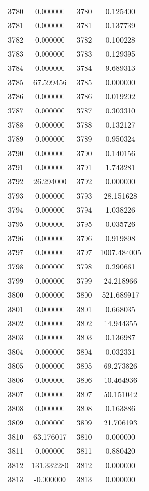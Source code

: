 \documentclass[12pt]{article}
\begin{document}
\begin{longtable}{@{}cccc@{}}
3780 & 0.000000 & 3780 & 0.125400 \\
3781 & 0.000000 & 3781 & 0.137739 \\
3782 & 0.000000 & 3782 & 0.100228 \\
3783 & 0.000000 & 3783 & 0.129395 \\
3784 & 0.000000 & 3784 & 9.689313 \\
3785 & 67.599456 & 3785 & 0.000000 \\
3786 & 0.000000 & 3786 & 0.019202 \\
3787 & 0.000000 & 3787 & 0.303310 \\
3788 & 0.000000 & 3788 & 0.132127 \\
3789 & 0.000000 & 3789 & 0.950324 \\
3790 & 0.000000 & 3790 & 0.140156 \\
3791 & 0.000000 & 3791 & 1.743281 \\
3792 & 26.294000 & 3792 & 0.000000 \\
3793 & 0.000000 & 3793 & 28.151628 \\
3794 & 0.000000 & 3794 & 1.038226 \\
3795 & 0.000000 & 3795 & 0.035726 \\
3796 & 0.000000 & 3796 & 0.919898 \\
3797 & 0.000000 & 3797 & 1007.484005 \\
3798 & 0.000000 & 3798 & 0.290661 \\
3799 & 0.000000 & 3799 & 24.218966 \\
3800 & 0.000000 & 3800 & 521.689917 \\
3801 & 0.000000 & 3801 & 0.668035 \\
3802 & 0.000000 & 3802 & 14.944355 \\
3803 & 0.000000 & 3803 & 0.136987 \\
3804 & 0.000000 & 3804 & 0.032331 \\
3805 & 0.000000 & 3805 & 69.273826 \\
3806 & 0.000000 & 3806 & 10.464936 \\
3807 & 0.000000 & 3807 & 50.151042 \\
3808 & 0.000000 & 3808 & 0.163886 \\
3809 & 0.000000 & 3809 & 21.706193 \\
3810 & 63.176017 & 3810 & 0.000000 \\
3811 & 0.000000 & 3811 & 0.880420 \\
3812 & 131.332280 & 3812 & 0.000000 \\
3813 & -0.000000 & 3813 & 0.000000 \\

\end{longtable}
\end{document}
